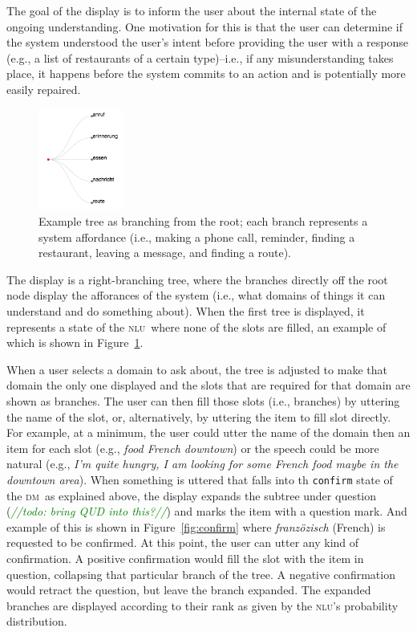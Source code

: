 \documentclass[11pt]{article}
\newcommand{\todo}[1]{\textcolor{green}{\emph{//todo: #1//}}}
\newcommand{\nlu}[0]{\textsc{nlu}}
\newcommand{\dm}[0]{\textsc{dm}}
\begin{document}
The goal of the display is to inform the user about the internal state of the ongoing understanding. One motivation for this is that the user can determine if the system understood the user's intent before providing the user with a response (e.g., a list of restaurants of a certain type)--i.e., if any misunderstanding takes place, it happens before the system commits to an action and is potentially more easily repaired. 

\begin{figure}
  \centering
      \includegraphics[width=0.25\textwidth]{figures/diatree-affordances.png}	
      \caption{Example tree as branching from the root; each branch represents a system affordance (i.e., making a phone call, reminder, finding a restaurant, leaving a message, and finding a route). \label{fig:afforances}}
\end{figure}

The display is a right-branching tree, where the branches directly off the root node display the afforances of the system (i.e., what domains of things it can understand and do something about). When the first tree is displayed, it represents a state of the \nlu\ where none of the slots are filled, an example of which is shown in Figure~\ref{fig:afforances}. 

When a user selects a domain to ask about, the tree is adjusted to make that domain the only one displayed and the slots that are required for that domain are shown as branches. The user can then fill those slots (i.e., branches) by uttering the name of the slot, or, alternatively, by uttering the item to fill slot directly. For example, at a minimum, the user could utter the name of the domain then an item for each slot (e.g.,  \emph{food French downtown}) or the speech could be more natural (e.g., \emph{I'm quite hungry, I am looking for some French food maybe in the downtown area}). When something is uttered that falls into th \texttt{confirm} state of the \dm\ as explained above, the display expands the subtree under question (\todo{bring QUD into this?}) and marks the item with a question mark. And example of this is shown in Figure~\ref{fig:confirm} where \emph{franzözisch} (French) is requested to be confirmed. At this point, the user can utter any kind of confirmation. A positive confirmation would fill the slot with the item in question, collapsing that particular branch of the tree. A negative confirmation would retract the question, but leave the branch expanded. The expanded branches are displayed according to their rank as given by the \nlu's probability distribution.
\end{document}
